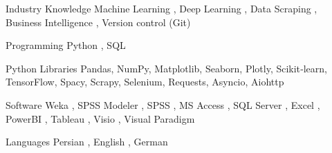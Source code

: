 

\begin{cvskills}

  \cvskill
    {Industry Knowledge} %
    {Machine Learning , Deep Learning , Data Scraping , Business Intelligence , Version control (Git)} %

  \cvskill
    {Programming} %
    {Python , SQL} %

  \cvskill
    {Python Libraries} %
    {Pandas, NumPy, Matplotlib, Seaborn, Plotly, Scikit‑learn, TensorFlow, Spacy, Scrapy, Selenium, Requests, Asyncio, Aiohttp} %

  \cvskill
    {Software} %
    {Weka , SPSS Modeler , SPSS , MS Access , SQL Server , Excel , PowerBI , Tableau , Visio , Visual Paradigm} %

  \cvskill
    {Languages} %
    {Persian , English , German} %


\end{cvskills}
